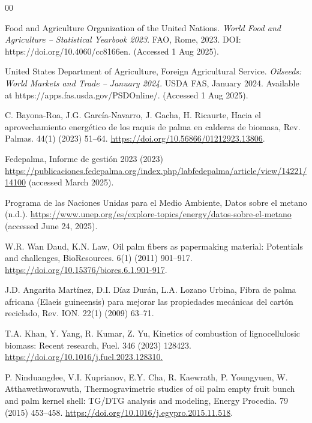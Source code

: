 \documentclass[preprint,12pt]{elsarticle}
\begin{document}

\begin{thebibliography}{00}

Food and Agriculture Organization of the United Nations.
\textit{World Food and Agriculture – Statistical Yearbook 2023}.
FAO, Rome, 2023.
DOI: https://doi.org/10.4060/cc8166en.
(Accessed 1 Aug 2025).

United States Department of Agriculture, Foreign Agricultural Service.
\textit{Oilseeds: World Markets and Trade – January 2024}.
USDA FAS, January 2024.
Available at
https://apps.fas.usda.gov/PSDOnline/.
(Accessed 1 Aug 2025).

 C. Bayona-Roa, J.G. García-Navarro, J. Gacha, H. Ricaurte, Hacia el aprovechamiento energético de los raquis de palma en calderas de biomasa, Rev. Palmas. 44(1) (2023) 51--64. \url{https://doi.org/10.56866/01212923.13806}.

 Fedepalma, Informe de gestión 2023 (2023) \url{https://publicaciones.fedepalma.org/index.php/labfedepalma/article/view/14221/14100} (accessed March 2025).

 Programa de las Naciones Unidas para el Medio Ambiente, Datos sobre el metano (n.d.). \url{https://www.unep.org/es/explore-topics/energy/datos-sobre-el-metano} (accessed June 24, 2025).

 W.R. Wan Daud, K.N. Law, Oil palm fibers as papermaking material: Potentials and challenges, BioResources. 6(1) (2011) 901--917. \url{https://doi.org/10.15376/biores.6.1.901-917}.

 J.D. Angarita Martínez, D.I. Díaz Durán, L.A. Lozano Urbina, Fibra de palma africana (Elaeis guineensis) para mejorar las propiedades mecánicas del cartón reciclado, Rev. ION. 22(1) (2009) 63--71.

 T.A. Khan, Y. Yang, R. Kumar, Z. Yu, Kinetics of combustion of lignocellulosic biomass: Recent research, Fuel. 346 (2023) 128423. \url{https://doi.org/10.1016/j.fuel.2023.128310.}

 P. Ninduangdee, V.I. Kuprianov, E.Y. Cha, R. Kaewrath, P. Youngyuen, W. Atthawethworawuth, Thermogravimetric studies of oil palm empty fruit bunch and palm kernel shell: TG/DTG analysis and modeling, Energy Procedia. 79 (2015) 453--458. \url{https://doi.org/10.1016/j.egypro.2015.11.518}.


\end{thebibliography}
\end{document}
